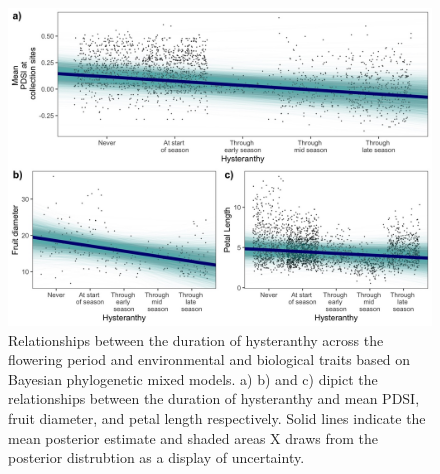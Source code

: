\documentclass{article}[11pt]
\begin{document}


\begin{figure}[h!]
    \centering
 \includegraphics[width=\textwidth]{..//..//Plots/dataplots.jpeg}
    \caption{Relationships between the duration of hysteranthy across the flowering period and environmental and biological traits based on Bayesian phylogenetic mixed models. a) b) and c) dipict the relationships between the duration of hysteranthy and mean PDSI, fruit diameter, and petal length respectively. Solid lines indicate the mean posterior estimate and shaded areas X draws from the posterior distrubtion as a display of uncertainty. }
    \label{fig:prunes}
\end{figure}
\end{document}
